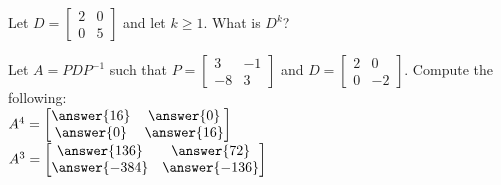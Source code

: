 \documentclass{ximera}
\begin{document}
  	  		      \begin{question} Let $D = \begin{bmatrix} 2 &0\\ 0&5\end{bmatrix}$ and let $k\geq 1$. What is $D^k$?\\
  	  		      	
  	  		      	\begin{multipleChoice}
  	  		      	\end{multipleChoice}
  	  		      	
  	  		      \end{question}	
  	  		       \begin{question} Let $A = PDP^{-1}$ such that $P= \begin{bmatrix} 3 &-1 \\ -8 &3\end{bmatrix}$ and $D = \begin{bmatrix} 2 &0 \\ 0 &-2\end{bmatrix}$. Compute the following:\\ 
  	  		       	
  	  		       	
  	  		       	$A^4 = \begin{bmatrix} \answer{16} &\answer{0}\\\answer{0} &\answer{16}\end{bmatrix}$\\
  	  		       
  	  		       	$A^3 = \begin{bmatrix} \answer{136} &\answer{72}\\\answer{-384} &\answer{-136}\end{bmatrix}$\\	
  	  		       	
  	  		       \end{question}	
\end{document}
